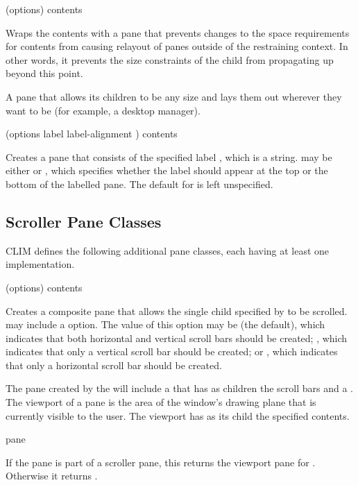  {(\rest options) \body contents}

Wraps the contents with a pane that prevents changes to the space requirements
for contents from causing relayout of panes outside of the restraining context.
In other words, it prevents the size constraints of the child from propagating
up beyond this point.



A pane that allows its children to be any size and lays them out wherever they
want to be (for example, a desktop manager).


 {(\rest options \key label label-alignment \allow)
                       \body contents}

Creates a pane that consists of the specified label , which is a
string.   may be either  or , which
specifies whether the label should appear at the top or the bottom of the
labelled pane.  The default for  is left unspecified.


\subsection {Scroller Pane Classes}

CLIM defines the following additional pane classes, each having at least one
implementation.

 {(\rest options) \body contents}

Creates a composite pane that allows the single child specified by
 to be scrolled.   may include a 
option.  The value of this option may be  (the default), which indicates
that both horizontal and vertical scroll bars should be created; ,
which indicates that only a vertical scroll bar should be created; or
, which indicates that only a horizontal scroll bar should be
created.

The pane created by the  will include a  that
has as children the scroll bars and a .  The viewport of a
pane is the area of the window's drawing plane that is currently visible to the
user.  The viewport has as its child the specified contents.

 {pane}

If the pane  is part of a scroller pane, this returns the viewport
pane for .  Otherwise it returns .

